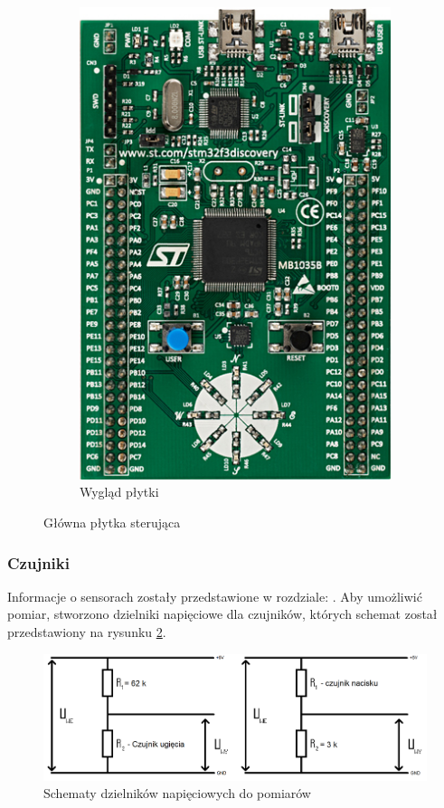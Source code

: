 \documentclass[12pt,a4paper]{article}
\begin{document}
\begin{figure}[!htb]
\begin{subfigure}{.5\textwidth}
	\includegraphics[height=.35\textheight]{images/32f3discovery.jpg}
	\caption{Wygląd płytki}
\end{subfigure}
\caption{Główna płytka sterująca}
\label{fig:discovery}
\end{figure}

\newpage
\subsubsection{Czujniki}
Informacje o sensorach zostały przedstawione w rozdziale: . Aby umożliwić pomiar, stworzono dzielniki napięciowe dla czujników, których schemat został przedstawiony na rysunku \ref{fig:dzielnik}.
\begin{figure}[!htb]
\centering
\includegraphics[width=.8\textwidth]{./images/dzielniki.png}
\caption{Schematy dzielników napięciowych do pomiarów 
\label{fig:dzielnik}}
\end{figure}
\end{document}
